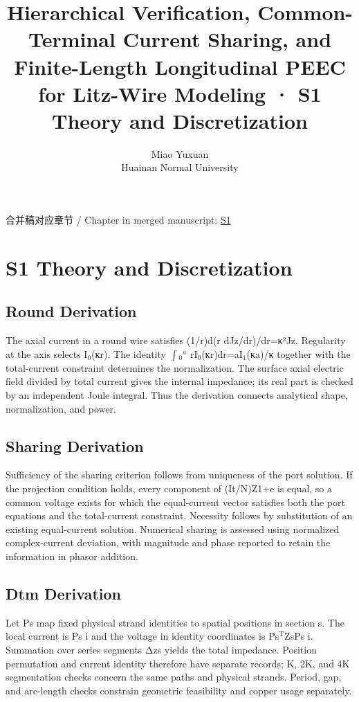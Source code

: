 \documentclass[11pt]{article}
\begin{document}
\title{Hierarchical Verification, Common-Terminal Current Sharing, and Finite-Length Longitudinal PEEC for Litz-Wire Modeling · S1 Theory and Discretization}
\author{Miao Yuxuan\\Huainan Normal University}
\date{}
\maketitle
\noindent 合并稿对应章节 / Chapter in merged manuscript: \href{paper_en_single.pdf#chapter-S1}{S1}\par
\FloatBarrier
\section*{S1 Theory and Discretization}
\hypertarget{chapter-S1}{}
\subsection*{Round Derivation}
\hypertarget{S1.round_derivation.heading}{}
The axial current in a round wire satisfies (1/r)d(r dJz/dr)/dr=κ²Jz. Regularity at the axis selects I\(_0\)(κr). The identity \(\int\)\(_0\)\(^a\) rI\(_0\)(κr)dr=aI\(_1\)(κa)/κ together with the total-current constraint determines the normalization. The surface axial electric field divided by total current gives the internal impedance; its real part is checked by an independent Joule integral. Thus the derivation connects analytical shape, normalization, and power.


\subsection*{Sharing Derivation}
\hypertarget{S1.sharing_derivation.heading}{}
Sufficiency of the sharing criterion follows from uniqueness of the port solution. If the projection condition holds, every component of (It/N)Z1+e is equal, so a common voltage exists for which the equal-current vector satisfies both the port equations and the total-current constraint. Necessity follows by substitution of an existing equal-current solution. Numerical sharing is assessed using normalized complex-current deviation, with magnitude and phase reported to retain the information in phasor addition.


\subsection*{Dtm Derivation}
\hypertarget{S1.dtm_derivation.heading}{}
Let Ps map fixed physical strand identities to spatial positions in section s. The local current is Ps i and the voltage in identity coordinates is Ps\(^{\mathrm T}\)ZsPs i. Summation over series segments Δzs yields the total impedance. Position permutation and current identity therefore have separate records; K, 2K, and 4K segmentation checks concern the same paths and physical strands. Period, gap, and arc-length checks constrain geometric feasibility and copper usage separately.
\end{document}
